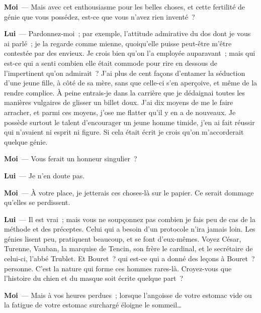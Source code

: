 \documentclass[french,twoside]{book} %
\newcommand{\labelchar}[1]{\textbf{\color{rubric} #1}}
\begin{document}
\labelchar{Moi} — Mais avec cet enthousiasme pour les belles choses, et cette fertilité de génie que vous possédez, est-ce que vous n’avez rien inventé ?\par
\labelchar{Lui} — Pardonnez-moi ; par exemple, l’attitude admirative du dos dont je vous ai parlé ; je la regarde comme mienne, quoiqu’elle puisse peut-être m’être contestée par des envieux. Je crois bien qu’on l’a employée auparavant ; mais qui est-ce qui a senti combien elle était commode pour rire en dessous de l’impertinent qu’on admirait ? J’ai plus de cent façons d’entamer la séduction d’une jeune fille, à côté de sa mère, sans que celle-ci s’en aperçoive, et même de la rendre complice. À peine entrais-je dans la carrière que je dédaignai toutes les manières vulgaires de glisser un billet doux. J’ai dix moyens de me le faire arracher, et parmi ces moyens, j’ose me flatter qu’il y en a de nouveaux. Je possède surtout le talent d’encourager un jeune homme timide, j’en ai fait réussir qui n’avaient ni esprit ni figure. Si cela était écrit je crois qu’on m’accorderait quelque génie.\par
\labelchar{Moi} — Vous ferait un honneur singulier ?\par
\labelchar{Lui} — Je n’en doute pas.\par
\labelchar{Moi} — À votre place, je jetterais ces choses-là sur le papier. Ce serait dommage qu’elles se perdissent.\par
\labelchar{Lui} — Il est vrai ; mais vous ne soupçonnez pas combien je fais peu de cas de la méthode et des préceptes. Celui qui a besoin d’un protocole n’ira jamais loin. Les génies lisent peu, pratiquent beaucoup, et se font d’eux-mêmes. Voyez César, Turenne, Vauban, la marquise de Tencin, son frère le cardinal, et le secrétaire de celui-ci, l’abbé Trublet. Et Bouret ? qui est-ce qui a donné des leçons à Bouret ? personne. C’est la nature qui forme ces hommes rares-là. Croyez-vous que l’histoire du chien et du masque soit écrite quelque part ?\par
\labelchar{Moi} — Mais à vos heures perdues ; lorsque l’angoisse de votre estomac vide ou la fatigue de votre estomac surchargé éloigne le sommeil…\par
\end{document}
